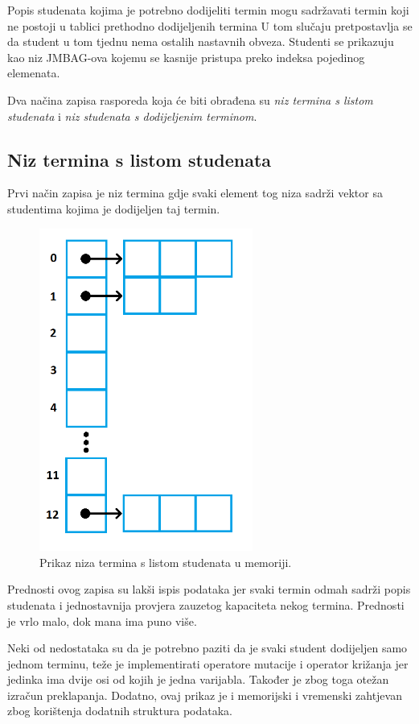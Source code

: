 \documentclass[times, utf8, zavrsni]{fer}
\begin{document}
Popis studenata kojima je potrebno dodijeliti termin mogu sadržavati termin koji ne postoji u tablici prethodno dodijeljenih termina U tom slučaju pretpostavlja se da student u tom tjednu nema ostalih nastavnih obveza. Studenti se prikazuju kao niz JMBAG-ova kojemu se kasnije pristupa preko indeksa pojedinog elemenata.

Dva načina zapisa rasporeda koja će biti obrađena su \emph{niz termina s listom studenata} i \emph{niz studenata s dodijeljenim terminom}.

\subsection{Niz termina s listom studenata}

Prvi način zapisa je niz termina gdje svaki element tog niza sadrži vektor sa studentima kojima je dodijeljen taj termin.

\begin{figure}[htb]
\centering
\includegraphics[width=7cm]{images/prikaz_jednike_1.png}
\caption{Prikaz niza termina s listom studenata u memoriji.}
\label{fig:prikaz_jednike_1}
\end{figure}

Prednosti ovog zapisa su lakši ispis podataka jer svaki termin odmah sadrži popis studenata i jednostavnija provjera zauzetog kapaciteta nekog termina. Prednosti je vrlo malo, dok mana ima puno više.

Neki od nedostataka su da je potrebno paziti da je svaki student dodijeljen samo jednom terminu, teže je implementirati operatore mutacije i operator križanja jer jedinka ima dvije osi od kojih je jedna varijabla. Također je zbog toga otežan izračun preklapanja. Dodatno, ovaj prikaz je i memorijski i vremenski zahtjevan zbog korištenja dodatnih struktura podataka.
\end{document}
